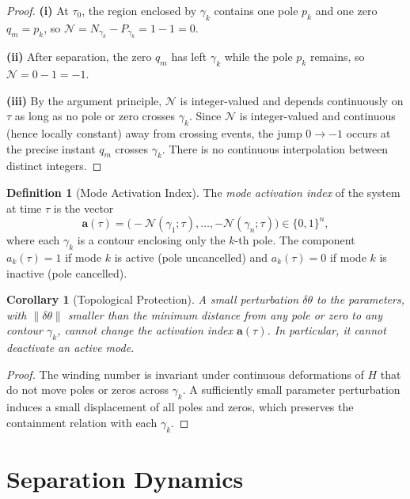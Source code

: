\documentclass[11pt,a4paper]{article}
\newtheorem{corollary}[theorem]{Corollary}
\theoremstyle{definition}
\newtheorem{definition}[theorem]{Definition}
\newcommand{\cN}{\mathcal{N}}
\begin{document}
\begin{proof}
\textbf{(i)} At $\tau_0$, the region enclosed by $\gamma_k$
contains one pole $p_k$ and one zero $q_m = p_k$, so
$\cN = N_{\gamma_k} - P_{\gamma_k} = 1 - 1 = 0$.

\textbf{(ii)} After separation, the zero $q_m$ has left $\gamma_k$
while the pole $p_k$ remains, so
$\cN = 0 - 1 = -1$.

\textbf{(iii)} By the argument principle, $\cN$ is integer-valued
and depends continuously on $\tau$ as long as no pole or zero
crosses $\gamma_k$. Since $\cN$ is integer-valued and continuous
(hence locally constant) away from crossing events, the jump
$0 \to -1$ occurs at the precise instant $q_m$ crosses $\gamma_k$.
There is no continuous interpolation between distinct integers.
\end{proof}

\begin{definition}[Mode Activation Index]\label{def:activation_index}
The \emph{mode activation index} of the system at time $\tau$ is
the vector
\begin{equation}
  \mathbf{a}(\tau)
  = \bigl(-\cN(\gamma_1;\tau),\ldots,
  -\cN(\gamma_n;\tau)\bigr) \in \{0,1\}^n,
\end{equation}
where each $\gamma_k$ is a contour enclosing only the $k$-th pole.
The component $a_k(\tau) = 1$ if mode $k$ is active (pole
uncancelled) and $a_k(\tau) = 0$ if mode $k$ is inactive
(pole cancelled).
\end{definition}

\begin{corollary}[Topological Protection]\label{cor:protection}
A small perturbation $\delta\theta$ to the parameters, with
$\|\delta\theta\|$ smaller than the minimum distance from any
pole or zero to any contour $\gamma_k$, cannot change the
activation index $\mathbf{a}(\tau)$. In particular, it cannot
deactivate an active mode.
\end{corollary}

\begin{proof}
The winding number is invariant under continuous deformations of
$H$ that do not move poles or zeros across $\gamma_k$. A
sufficiently small parameter perturbation induces a small
displacement of all poles and zeros, which preserves the
containment relation with each $\gamma_k$.
\end{proof}

\section{Separation Dynamics}\label{sec:separation}
\end{document}
